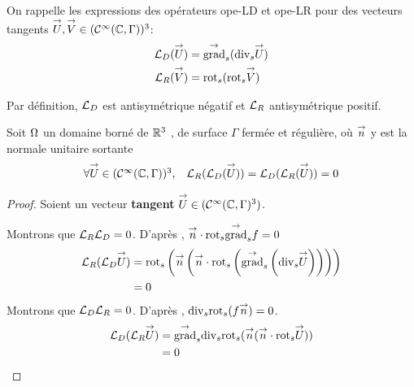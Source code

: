   \begin{defn}
    On rappelle les expressions des opérateurs \gls{ope-LD} et \gls{ope-LR} pour des vecteurs tangents \(\vect U,\vect V \in (\mathcal{C}^\infty(\CC,\Gamma))^3\): 
    \begin{align*}
      \LD(\vect U) &= \tgrads (\tdivs \vect U)\\
      \LR(\vect V) &= \trots( \trots \vect V)
    \end{align*}
  \end{defn}

  \begin{prop}
    Par définition, \(\LD\) est antisymétrique négatif et \(\LR\) antisymétrique positif.
  \end{prop}

  \begin{prop}
    Soit \(\OO\) un domaine borné de \(\RR^3\) , de surface \(\Gamma\) fermée et régulière, où \(\vect n\) y est la normale unitaire
    sortante
    \begin{equation}
      \begin{matrix}
        \forall \vect U \in (\mathcal{C}^\infty(\CC,\Gamma))^3 ,& \LR(\LD(\vect U)) = \LD(\LR(\vect U)) = 0
      \end{matrix}
    \end{equation}
  \end{prop}
  \begin{proof}

    Soient un vecteur \textbf{tangent} \(\vect U \in (\mathcal{C}^\infty(\CC,\Gamma)^3)\). 

    Montrons que \(\LR\LD = 0\).
    D’après \cite[p.~1029, A3.42]{bladel_electromagnetic_2007}, \(\vn \cdot \trots\tgrads f = 0\)
    \begin{align*}
      \LR(\LD \vect U)  &= \trots \left(\vn \left(\vn \cdot \trots \left( \tgrads \left(\tdivs \vect U\right)\right)\right)\right) \\
      &= 0
    \end{align*}
    Montrons que \(\LD\LR = 0\).
    D’après \cite[p.~1029, A3.43]{bladel_electromagnetic_2007}, \(\tdivs \trots (f\vn) = 0\).
    \begin{align*}
      \LD(\LR \vect U) &= \tgrads \tdivs \trots (\vn (\vn \cdot \trots \vect U)) \\
      &= 0
    \end{align*}
  \end{proof}


